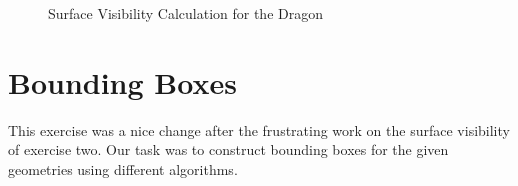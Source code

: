 \documentclass[a4paper,10pt,notitlepage]{scrreprt}
\begin{document}
\begin{figure}
 \caption{Surface Visibility Calculation for the Dragon}
 \label{fig:sv-dragon}
\end{figure}

\chapter{Bounding Boxes}

This exercise was a nice change after the frustrating work on the surface
visibility of exercise two. Our task was to construct bounding boxes for the
given geometries using different algorithms.
\end{document}

